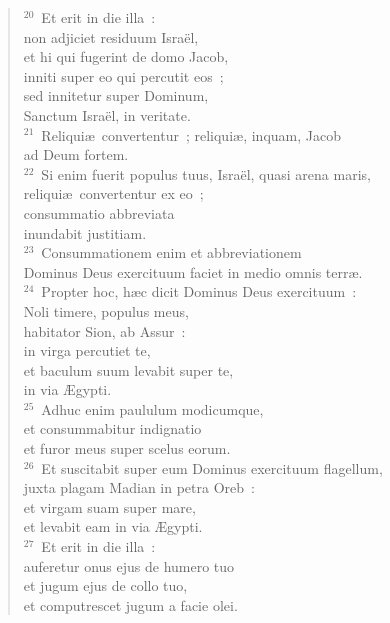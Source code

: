 \begin{verse}${}^{20}$~Et erit in die illa~:\\ non adjiciet residuum Isra\"el,\\ et hi qui fugerint de domo Jacob,\\ inniti super eo qui percutit eos~;\\ sed innitetur super Dominum,\\ Sanctum Isra\"el, in veritate.\\
${}^{21}$~Reliqui\ae\ convertentur~; reliqui\ae , inquam, Jacob\\ ad Deum fortem.\\
${}^{22}$~Si enim fuerit populus tuus, Isra\"el, quasi arena maris,\\ reliqui\ae\ convertentur ex eo~;\\ consummatio abbreviata\\ inundabit justitiam.\\
${}^{23}$~Consummationem enim et abbreviationem\\ Dominus Deus exercituum faciet in medio omnis terr\ae .\\
${}^{24}$~Propter hoc, h\ae c dicit Dominus Deus exercituum~:\\ Noli timere, populus meus,\\ habitator Sion, ab Assur~:\\ in virga percutiet te,\\ et baculum suum levabit super te,\\ in via \AE gypti.\\
${}^{25}$~Adhuc enim paululum modicumque,\\ et consummabitur indignatio\\ et furor meus super scelus eorum.\\
${}^{26}$~Et suscitabit super eum Dominus exercituum flagellum,\\ juxta plagam Madian in petra Oreb~:\\ et virgam suam super mare,\\ et levabit eam in via \AE gypti.\\
${}^{27}$~Et erit in die illa~:\\ auferetur onus ejus de humero tuo\\ et jugum ejus de collo tuo,\\ et computrescet jugum a facie olei.\end{verse}


